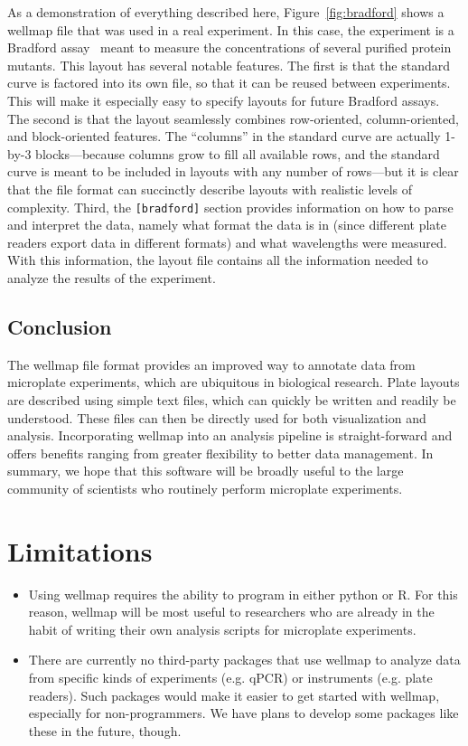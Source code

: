 \documentclass{bmcart}
\begin{document}
As a demonstration of everything described here, Figure~\ref{fig:bradford} shows a wellmap file that was used in a real experiment. In this case, the experiment is a Bradford assay~\cite{bradford1976} meant to measure the concentrations of several purified protein mutants. This layout has several notable features. The first is that the standard curve is factored into its own file, so that it can be reused between experiments. This will make it especially easy to specify layouts for future Bradford assays. The second is that the layout seamlessly combines row-oriented, column-oriented, and block-oriented features. The ``columns'' in the standard curve are actually 1-by-3 blocks---because columns grow to fill all available rows, and the standard curve is meant to be included in layouts with any number of rows---but it is clear that the file format can succinctly describe layouts with realistic levels of complexity. Third, the \texttt{{[}bradford{]}} section provides information on how to parse and interpret the data, namely what format the data is in (since different plate readers export data in different formats) and what wavelengths were measured. With this information, the layout file contains all the information needed to analyze the results of the experiment.

\subsection*{Conclusion}

The wellmap file format provides an improved way to annotate data from microplate experiments, which are ubiquitous in biological research. Plate layouts are described using simple text files, which can quickly be written and readily be understood. These files can then be directly used for both visualization and analysis. Incorporating wellmap into an analysis pipeline is straight-forward and offers benefits ranging from greater flexibility to better data management. In summary, we hope that this software will be broadly useful to the large community of scientists who routinely perform microplate experiments.

\section*{Limitations}

\begin{itemize}

\item Using wellmap requires the ability to program in either python or R. For this reason, wellmap will be most useful to researchers who are already in the habit of writing their own analysis scripts for microplate experiments.

\item There are currently no third-party packages that use wellmap to analyze data from specific kinds of experiments (e.g. qPCR) or instruments (e.g. plate readers). Such packages would make it easier to get started with wellmap, especially for non-programmers. We have plans to develop some packages like these in the future, though.

\end{itemize}
\end{document}
